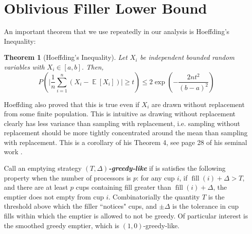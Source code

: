 \documentclass[twocolumn]{article}[10pt]
\newcommand{\defn}[1]{{\textit{\textbf{\boldmath #1}}}\xspace}
\DeclareMathOperator{\E}{\mathbb{E}}
\DeclareMathOperator{\fil}{\text{fill}}
\newtheorem{theorem}{Theorem}
\begin{document}
\section{Oblivious Filler Lower Bound}\label{sec:oblivious}
An important theorem that we use repeatedly in our analysis is Hoeffding's Inequality:
\begin{theorem}[Hoeffding's Inequality]
  Let $X_i$ be independent bounded random variables with $X_i \in [a,b]$. Then,
  $$P\left(\Big|\frac{1}{n} \sum_{i=1}^n (X_i - \E[X_i])\Big|\ge t\right) \le
  2\exp\left(-\frac{2nt^2}{(b-a)^2}\right) $$
\end{theorem}
Hoeffding also proved that this is true even if $X_i$ are drawn without
replacement from some finite population. This is intuitive as drawing without
replacement clearly has less variance than sampling with replacement, i.e.
sampling without replacement should be more tightly concentrated around the
mean than sampling with replacement. This is a corollary of his Theorem 4, see
page 28 of his seminal work \cite{who62}.

Call an emptying strategy $(T, \Delta)$\defn{-greedy-like} if is satisfies
the following property when the number of processors is $p$: for any cup
$i$, if $\fil(i) + \Delta > T$, and there are at least $p$ cups containing fill
greater than $\fil(i) + \Delta$, the emptier does not empty from cup $i$. 
Combinatorially the quantity $T$ is the threshold above which the filler
``notices" cups, and $\pm\Delta$ is the tolerance in cup fills within which the
emptier is allowed to not be greedy.
Of particular interest is the smoothed greedy emptier, which is $(1, 0)$-greedy-like.
\end{document}

